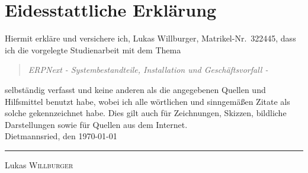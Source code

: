 \chapter{Eidesstattliche Erklärung}
Hiermit erkläre und versichere ich, Lukas Willburger, Matrikel-Nr.\ 322445, dass ich die vorgelegte Studienarbeit mit dem Thema
\begin{quote}
\textit{ERPNext} \textit{- Systembestandteile, Installation und Geschäftsvorfall -}
\end{quote}
selbständig verfasst und keine anderen als die angegebenen Quellen und Hilfsmittel benutzt habe, wobei ich alle wörtlichen und sinngemäßen Zitate als solche gekennzeichnet habe.  Dies gilt auch für Zeichnungen, Skizzen, bildliche Darstellungen sowie für Quellen aus dem Internet.
\\[6ex]

Dietmannsried, den \today \\


\rule[-0.2cm]{5cm}{0.5pt}

Lukas \textsc{Willburger} 
